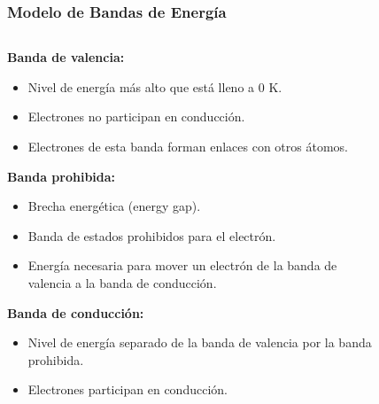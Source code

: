 \documentclass[10pt,t,aspectratio=169]{beamer}
\begin{document}
\begin{frame}[t]
    \frametitle{Modelo de Bandas de Energía}

    \begin{columns}
        \begin{column}{0.6\textwidth}
            \textbf{Banda de valencia:}
            \begin{itemize}
                \item Nivel de energía más alto que está lleno a 0 K.
                \item Electrones no participan en conducción.
                \item Electrones de esta banda forman enlaces con otros átomos.
            \end{itemize}
            
            \textbf{Banda prohibida:}
            \begin{itemize}
                \item Brecha energética (energy gap).
                \item Banda de estados prohibidos para el electrón.
                \item Energía necesaria para mover un electrón de la banda de valencia a la banda de conducción.
            \end{itemize}
            
            \textbf{Banda de conducción:}
            \begin{itemize}
                \item Nivel de energía separado de la banda de valencia por la banda prohibida.
                \item Electrones participan en conducción.
            \end{itemize}
        \end{column}
        \begin{column}{0.4\textwidth}
            \centering
            \begin{figure}[H]
            \end{figure}


\end{column}
\end{columns}
\end{frame}
\end{document}
